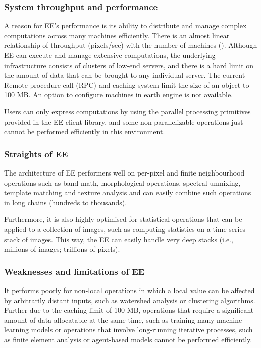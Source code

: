 \subsubsection{System throughput and performance}

A reason for EE's performance is its ability to distribute and manage complex computations across many machines efficiently. There is an almost linear relationship of throughput (pixels/sec) with the number of machines (\cite{gorelick2017google}).
Although EE can execute and manage extensive computations, the underlying infrastructure consists of clusters of low-end servers, and there is a hard limit on the amount of data that can be brought to any individual server. The current Remote procedure call (RPC) and caching system limit the size of an object to 100 MB. An option to configure machines in earth engine is not available.

Users can only express computations by using the parallel processing primitives provided in the EE client library, and some non-parallelizable operations just cannot be performed efficiently in this environment.

\subsubsection{Straights of EE}

The architecture of EE performers well on per-pixel and finite neighbourhood operations such as band-math, morphological operations, spectral unmixing, template matching and texture analysis and can easily combine such operations in long chains (hundreds to thousands). 

Furthermore, it is also highly optimised for statistical operations
that can be applied to a collection of images, such as computing statistics on a time-series stack of images. This way, the EE can easily handle very deep stacks (i.e., millions of images; trillions of pixels). 

\subsubsection{Weaknesses and limitations of EE}

It performs poorly for non-local operations in which a local value can be affected by arbitrarily distant inputs, such as watershed analysis or clustering algorithms. Further due to the caching limit of 100 MB, operations that require a significant amount of data allocatable at the same time, such as training many machine learning models or operations that involve long-running iterative processes, such as finite element analysis or agent-based models cannot be performed efficiently. 

